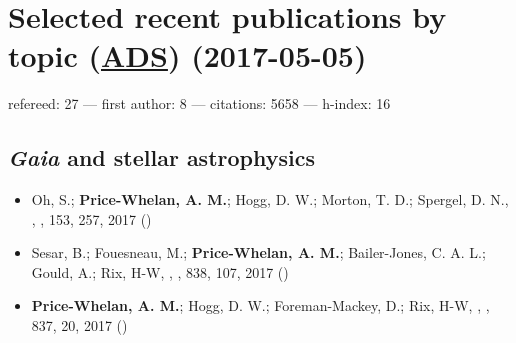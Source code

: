 \documentclass[12pt,letterpaper]{article}
\begin{document}
\section*{Selected recent publications by topic (\href{\adsurl}{ADS}) (2017-05-05)}
    refereed: 27 ---
    first author: 8 ---
    citations: 5658 ---
    h-index: 16

    \vspace{1em}

	\subsection*{\textbf{\textit{Gaia}} and stellar astrophysics}
	\begin{itemize}

\item Oh, S.; {\bf Price-Whelan, A. M.}; Hogg, D. W.; Morton, T. D.; Spergel, D. N.,
    ,
    \aj, 153, 257, 2017 ()

\item Sesar, B.; Fouesneau, M.; {\bf Price-Whelan, A. M.}; Bailer-Jones, C. A. L.; Gould, A.; Rix, H-W,
    ,
    \apj, 838, 107, 2017 ()

\item {\bf Price-Whelan, A. M.}; Hogg, D. W.; Foreman-Mackey, D.; Rix, H-W,
    ,
    \apj, 837, 20, 2017 ()

    \end{itemize}
\end{document}
